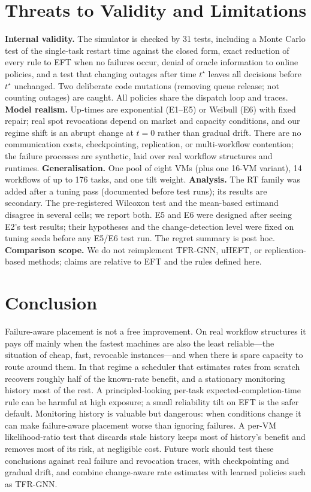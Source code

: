 \documentclass[10pt,twocolumn,letterpaper]{article}
\newcommand{\EFT}{\textsf{EFT}}
\newcommand{\RT}{\textsf{RT}}
\begin{document}
\section{Threats to Validity and Limitations}
\label{sec:validation}
\textbf{Internal validity.} The simulator is checked by 31 tests, including a Monte Carlo test of the single-task restart time
against the closed form, exact reduction of every rule to \EFT{} when no failures occur, denial of oracle information to online
policies, and a test that changing outages after time $t^\star$ leaves all decisions before $t^\star$ unchanged. Two deliberate
code mutations (removing queue release; not counting outages) are caught. All policies share the dispatch loop and traces.
\textbf{Model realism.} Up-times are exponential (E1--E5) or Weibull (E6) with fixed repair; real spot revocations depend on
market and capacity conditions, and our regime shift is an abrupt change at $t=0$ rather than gradual drift. There are no communication costs, checkpointing, replication, or multi-workflow contention;
the failure processes are synthetic, laid over real workflow structures and runtimes. \textbf{Generalisation.} One pool of
eight VMs (plus one 16-VM variant), 14 workflows of up to 176 tasks, and one tilt weight. \textbf{Analysis.} The \RT{} family was
added after a tuning pass (documented before test runs); its results are secondary. The pre-registered Wilcoxon test and the
mean-based estimand disagree in several cells; we report both. E5 and E6 were designed after seeing E2's test results; their
hypotheses and the change-detection level were fixed on tuning seeds before any E5/E6 test run. The regret summary is post hoc. \textbf{Comparison scope.} We do not reimplement TFR-GNN, uHEFT,
or replication-based methods; claims are relative to \EFT{} and the rules defined here.

\section{Conclusion}
Failure-aware placement is not a free improvement. On real workflow structures it pays off mainly when the fastest machines are
also the least reliable---the situation of cheap, fast, revocable instances---and when there is spare capacity to route around
them. In that regime a scheduler that estimates rates from scratch recovers roughly half of the known-rate benefit, and a
stationary monitoring history most of the rest. A principled-looking per-task expected-completion-time rule can be harmful at high
exposure; a small reliability tilt on EFT is the safer default. Monitoring history is valuable but dangerous: when conditions
change it can make failure-aware placement worse than ignoring failures. A per-VM likelihood-ratio test that discards stale
history keeps most of history's benefit and removes most of its risk, at negligible cost. Future work should test these
conclusions against real failure and revocation traces, with checkpointing and gradual drift, and combine change-aware rate
estimates with learned policies such as TFR-GNN.
\end{document}
